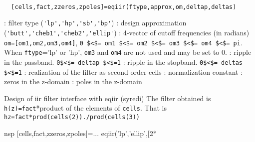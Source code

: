 
\begin{mandesc}
   \\ %
\end{mandesc}
\begin{calling_sequence}
\begin{verbatim}
  [cells,fact,zzeros,zpoles]=eqiir(ftype,approx,om,deltap,deltas)  
\end{verbatim}
\end{calling_sequence}
\begin{parameters}
  \begin{varlist}
    : filter type (\verb!'lp','hp','sb','bp'!)
    : design approximation (\verb!'butt','cheb1','cheb2','ellip'!)
    : 4-vector of cutoff frequencies (in radians)  \verb!om=[om1,om2,om3,om4]!, \verb!0 $<$= om1 $<$= om2 $<$= om3 $<$= om4 $<$= pi!.  When \verb!ftype!='lp' or 'hp', \verb!om3! and \verb!om4! are not used  and may be set to 0.
    : ripple in the passband. \verb!0$<$= deltap $<$=1!
    : ripple in the stopband. \verb!0$<$= deltas $<$=1!
    : realization of the filter as second order cells
    : normalization constant
    : zeros in the z-domain
    : poles in the z-domain
  \end{varlist}
\end{parameters}
\begin{mandescription}
  Design of iir filter interface with eqiir (syredi)
  The filter obtained is \verb!h(z)=fact!*product of the elements of
  \verb!cells!.
  That is \verb!hz=fact*prod(cells(2))./prod(cells(3))!
\end{mandescription}
\begin{examples}
  \begin{mintednsp}{nsp}
    [cells,fact,zzeros,zpoles]=...
    eqiir('lp','ellip',[2*%
  \end{mintednsp}
\end{examples}
\begin{manseealso}
     
\end{manseealso}
